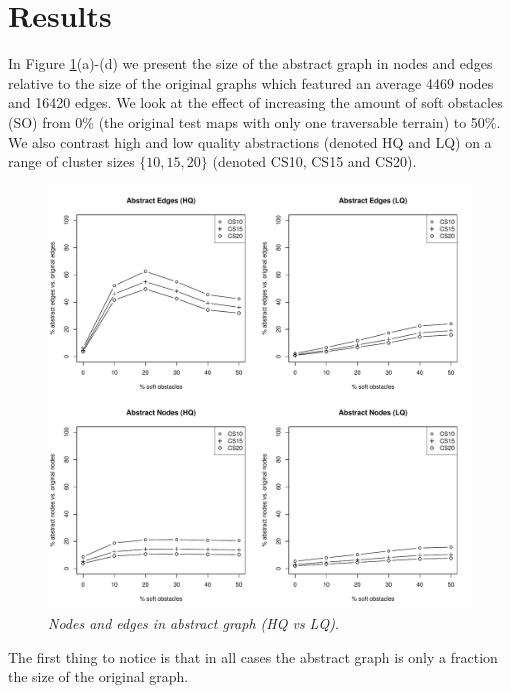 \section{Results}
In Figure \ref{aha-fig:graphsize}(a)-(d) we present the size of the abstract graph in nodes and edges relative to the size of the original graphs which featured an average 4469 nodes and 16420 edges. 
We look at the effect of increasing the amount of soft obstacles (SO) from 0\% (the original test maps with only one traversable terrain) to 50\%.
We also contrast high and low quality abstractions (denoted HQ and LQ) on a range of cluster sizes $\lbrace 10, 15, 20 \rbrace$ (denoted CS10, CS15 and CS20).
\begin{figure}[htbp]
	\vspace{-12pt}
       \caption{\small{\emph{Nodes and edges in abstract graph (HQ vs LQ). }}}
       \begin{center}
                       \includegraphics[scale=0.35, trim = 20mm 12mm 20mm 5mm]{diagrams/graphsize.pdf}
       \end{center}
       \label{aha-fig:graphsize}
	\vspace{-5pt}
\end{figure}
\par \indent
The first thing to notice is that in all cases the abstract graph is only a fraction the size of the original graph.
